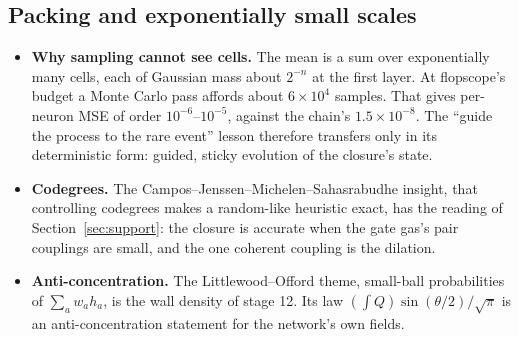 \subsection{Packing and exponentially small scales}
\begin{itemize}[leftmargin=*]
\item \textbf{Why sampling cannot see cells.} The mean is a sum over exponentially many cells, each of Gaussian mass about $2^{-n}$ at
the first layer. At flopscope's budget a Monte Carlo pass affords about $6\times10^4$ samples. That gives per-neuron MSE of order
$10^{-6}$--$10^{-5}$, against the chain's $1.5\times10^{-8}$. The ``guide the process to the rare event'' lesson therefore transfers only in its
deterministic form: guided, sticky evolution of the closure's state.
\item \textbf{Codegrees.} The Campos--Jenssen--Michelen--Sahasrabudhe insight, that controlling codegrees makes a random-like
heuristic exact, has the reading of Section~\ref{sec:support}: the closure is accurate when the gate gas's pair couplings are small,
and the one coherent coupling is the dilation.
\item \textbf{Anti-concentration.} The Littlewood--Offord theme, small-ball probabilities of $\sum_aw_ah_a$, is the wall density of
stage 12. Its law $(\int Q)\sin(\theta/2)/\sqrt\pi$ is an anti-concentration statement for the network's own fields.
\end{itemize}
